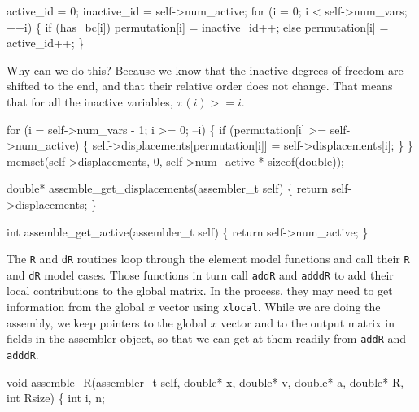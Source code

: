 \nwenddocs{}\endmoddef
active_id   = 0;
inactive_id = self->num_active;
for (i = 0; i < self->num_vars; ++i) \{
    if (has_bc[i])
        permutation[i] = inactive_id++;
    else
        permutation[i] = active_id++;
\}
\nwendcode{}\nwdocspar

Why can we do this?  Because we know that the inactive degrees of freedom
are shifted to the end, and that their relative order does not change.
That means that for all the inactive variables, $\pi(i) >= i$.

\nwenddocs{}\endmoddef
for (i = self->num_vars - 1; i >= 0; --i) \{
    if (permutation[i] >= self->num_active) \{
        self->displacements[permutation[i]] = self->displacements[i];
    \}
\}
memset(self->displacements, 0, self->num_active * sizeof(double));
\nwendcode{}\nwdocspar

\nwenddocs{}\plusendmoddef
double* assemble_get_displacements(assembler_t self)
\{
    return self->displacements;
\}

int assemble_get_active(assembler_t self)
\{
    return self->num_active;
\}

\nwendcode{}\nwdocspar

The {\tt{}R} and {\tt{}dR} routines loop through the element model
functions and call their {\tt{}R} and {\tt{}dR} model cases.  Those functions
in turn call {\tt{}add{}R} and {\tt{}add{}dR} to add their
local contributions to the global matrix.  In the process, they
may need to get information from the global $x$ vector using {\tt{}xlocal}.
While we are doing the assembly, we keep pointers to the global $x$
vector and to the output matrix in fields in the assembler object,
so that we can get at them readily from {\tt{}add{}R} and {\tt{}add{}dR}.

\nwenddocs{}\plusendmoddef
void assemble_R(assembler_t self, double* x, double* v, double* a, double* R,
                int Rsize)
\{
    int i, n;

